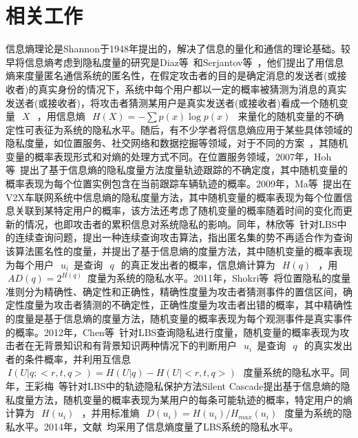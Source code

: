 \section{相关工作}\label{related work}

信息熵理论是Shannon于1948年提出的，解决了信息的量化和通信的理论基础。较早将信息熵考虑到隐私度量的研究是Diaz等~\cite{diaz2002towards}和Serjantov等~\cite{serjantov2002towards}，他们提出了用信息熵来度量匿名通信系统的匿名性，在假定攻击者的目的是确定消息的发送者(或接收者)的真实身份的情况下，系统中每个用户都以一定的概率被猜测为消息的真实发送者(或接收者)，将攻击者猜测某用户是真实发送者(或接收者)看成一个随机变量~$~X~$~，用信息熵~$~H(X)=-\sum p(x)\log p(x)~$~来量化的随机变量的不确定性可表征为系统的隐私水平。随后，有不少学者将信息熵应用于某些具体领域的隐私度量，如位置服务、社交网络和数据挖掘等领域，对于不同的方案~\cite{serjantov2002towards,shokri2011quantifying,wang2012location}，其随机变量的概率表现形式和对熵的处理方式不同。在位置服务领域，2007年，Hoh等~\cite{hoh2007preserving}提出了基于信息熵的隐私度量方法度量轨迹跟踪的不确定度，其中随机变量的概率表现为每个位置实例包含在当前跟踪车辆轨迹的概率。2009年，Ma等~\cite{ma2009measuring}提出在V2X车联网系统中信息熵的隐私度量方法，其中随机变量的概率表现为每个位置信息关联到某特定用户的概率，该方法还考虑了随机变量的概率随着时间的变化而更新的情况，也即攻击者的累积信息对系统隐私的影响。同年，林欣等~\cite{lin2009lbs}针对LBS中的连续查询问题，提出一种连续查询攻击算法，指出匿名集的势不再适合作为查询该算法匿名性的度量，并提出了基于信息熵的度量方法，其中随机变量的概率表现为每个用户~$~u_{i}$~是查询~$~q~$~的真正发出者的概率，信息熵计算为~$~H(q)~$~，用~$~AD(q)=2^{H(q)}$~度量为系统的隐私水平。2011年，Shokri等~\cite{shokri2011quantifying}将位置隐私的度量准则分为精确性、确定性和正确性，精确性度量为攻击者猜测事件的置信区间，确定性度量为攻击者猜测的不确定性，正确性度量为攻击者出错的概率，其中精确性的度量是基于信息熵的度量方法，随机变量的概率表现为每个观测事件是真实事件的概率。2012年，Chen等~\cite{chen2012measuring}针对LBS查询隐私进行度量，随机变量的概率表现为攻击者在无背景知识和有背景知识两种情况下的判断用户~$~u_{i}$~是查询~$~q~$~的真实发出者的条件概率，并利用互信息~$~I(U|q;<r,t,q>)=H(U|q)-H(U|<r,t,q>)~$~度量系统的隐私水平。同年，王彩梅~\cite{wang2012location}等针对LBS中的轨迹隐私保护方法Silent Cascade提出基于信息熵的隐私度量方法，随机变量的概率表现为某用户的每条可能轨迹的概率，特定用户的熵计算为~$~H(u_{i})~$~，并用标准熵~$~D(u_{i})=H(u_{i})/H_{max}(u_{i})~$~度量为系统的隐私水平。2014年，文献~\cite{niu2014achieving,olteanu2017quantifying}均采用了信息熵度量了LBS系统的隐私水平。

